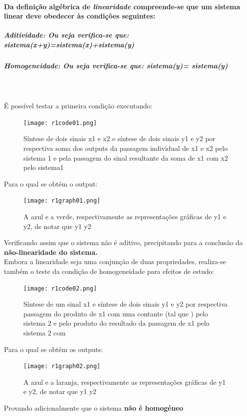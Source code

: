 \documentclass[a4paper,12pt]{article}
\begin{document}
			\paragraph{Da definição algébrica de \textit{linearidade} compreende-se que um sistema linear deve obedecer às condições seguintes:}
				\subparagraph{\textbf{Aditividade:} Ou seja verifica-se que: \textit{sistema(x+y)=sistema(x)+sistema(y)}}
				\subparagraph{\textbf{Homogeneidade: Ou seja verifica-se que: \textit{sistema(}}\textbf{\alpha \textit{y)=} \alpha \textbf{\textit{sistema(y)}}}} \mbox{}\\ \mbox{}\\
			É possível testar a primeira condição executando:
			\begin{figure}[H]
				\centering
					\captionsetup{justification=centering}
					\texttt{[image: r1code01.png]}
					\caption{Síntese de dois sinais x1 e x2 e síntese de dois sinais y1 e y2 por respectiva soma dos outputs da passagem individual de x1   e x2 pelo sistema 1 e pela passagem do sinal resultante da soma de x1 com x2 pelo sistema1}
			\end{figure}
			Para o qual se obtém o output:
			\begin{figure}[H]
  				\centering
  				\captionsetup{justification=centering}
  				\texttt{[image: r1graph01.png]}
				\caption{A azul e a verde, respectivamente as representações gráficas de y1 e y2, de notar que y1 \neq y2}
			\end{figure}
			Verificando assim que o sistema não é aditivo, precipitando para a conclusão da  \textbf{não-linearidade do sistema.}\\
			Embora a linearidade seja uma conjunção de duas propriedades, realiza-se também o teste da condição de homogeneidade para efeitos de estudo:
 			\begin{figure}[H]
  				\centering
  				\captionsetup{justification=centering}
  				\texttt{[image: r1code02.png]}
				\caption{Síntese de um sinal x1 e síntese de dois sinais y1 e y2 por respectiva passagem do produto de x1 com uma contante \textbeta (tal que ) pelo sistema 2 e pelo produto do resultado da passagem de x1 pelo sistema 2 com \textbeta}
  			\end{figure}
			Para o qual se obtém os outputs:
			\begin{figure}[H]
    				\centering
    				\captionsetup{justification=centering}
    				\texttt{[image: r1graph02.png]}
				\caption{A azul e a laranja, respectivamente as representações gráficas de y1   e y2, de notar que y1 \neq y2}
  			\end{figure}
			Provando adicionalmente que o sistema \textbf{não é homogéneo}
			\newpage
\end{document}
